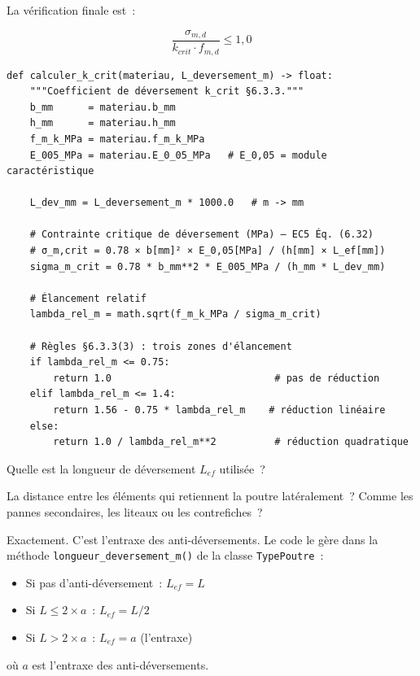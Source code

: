 \documentclass[12pt, a4paper, openany]{book}
\newcommand{\py}[1]{\texttt{#1}}
\newcommand{\fichier}[1]{\texttt{\textit{#1}}}
\begin{document}
La v\'erification finale est~:

\begin{equation}
\frac{\sigma_{m,d}}{k_{crit} \cdot f_{m,d}} \leq 1{,}0
\label{eq:taux_dever}
\end{equation}

\begin{lstlisting}[style=python, caption={\fichier{ec5/elu.py} --- coefficient de déversement \py{calculer\_k\_crit()}}]
def calculer_k_crit(materiau, L_deversement_m) -> float:
    """Coefficient de déversement k_crit §6.3.3."""
    b_mm      = materiau.b_mm
    h_mm      = materiau.h_mm
    f_m_k_MPa = materiau.f_m_k_MPa
    E_005_MPa = materiau.E_0_05_MPa   # E_0,05 = module caractéristique

    L_dev_mm = L_deversement_m * 1000.0   # m -> mm

    # Contrainte critique de déversement (MPa) — EC5 Éq. (6.32)
    # σ_m,crit = 0.78 × b[mm]² × E_0,05[MPa] / (h[mm] × L_ef[mm])
    sigma_m_crit = 0.78 * b_mm**2 * E_005_MPa / (h_mm * L_dev_mm)

    # Élancement relatif
    lambda_rel_m = math.sqrt(f_m_k_MPa / sigma_m_crit)

    # Règles §6.3.3(3) : trois zones d'élancement
    if lambda_rel_m <= 0.75:
        return 1.0                            # pas de réduction
    elif lambda_rel_m <= 1.4:
        return 1.56 - 0.75 * lambda_rel_m    # réduction linéaire
    else:
        return 1.0 / lambda_rel_m**2          # réduction quadratique
\end{lstlisting}

\begin{maitre}
Quelle est la longueur de d\'eversement $L_{ef}$ utilis\'ee~?
\end{maitre}

\begin{apprenti}
La distance entre les \'el\'ements qui retiennent la poutre lat\'eralement~?
Comme les pannes secondaires, les liteaux ou les contrefiches~?
\end{apprenti}

\begin{maitre}
Exactement. C'est l'entraxe des anti-d\'eversements. Le code le g\`ere
dans la m\'ethode \py{longueur\_deversement\_m()} de la classe \py{TypePoutre}~:
\begin{itemize}
  \item Si pas d'anti-d\'eversement~: $L_{ef} = L$
  \item Si $L \leq 2 \times a$~: $L_{ef} = L/2$
  \item Si $L > 2 \times a$~: $L_{ef} = a$ (l'entraxe)
\end{itemize}
o\`u $a$ est l'entraxe des anti-d\'eversements.
\end{maitre}
\end{document}
